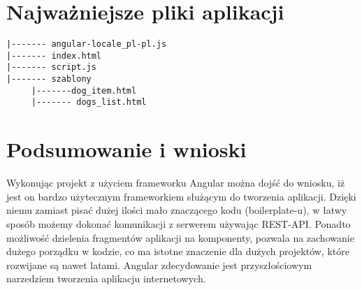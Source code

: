 \documentclass{article}
\begin{document}
\section{Najważniejsze pliki aplikacji}
\begin{lstlisting}[frame=single]  
|------- angular-locale_pl-pl.js
|------- index.html
|------- script.js
|------- szablony
	 |-------dog_item.html
	 |------- dogs_list.html
\end{lstlisting}

\section{Podsumowanie i wnioski}

Wykonując projekt z użyciem frameworku Angular można dojść do wniosku, iż jest on bardzo użytecznym frameworkiem służącym do tworzenia aplikacji. Dzięki niemu zamiast pisać dużej ilości mało znaczącego kodu (boilerplate-u), w łatwy sposób możemy dokonać komunikacji z serwerem używając REST-API. Ponadto możliwość dzielenia fragmentów aplikacji na komponenty, pozwala na zachowanie dużego porządku w kodzie, co ma istotne znaczenie dla dużych projektów, które rozwijane są nawet latami. Angular zdecydowanie jest przyszłościowym narzedziem tworzenia aplikacju internetowych.
\end{document}
